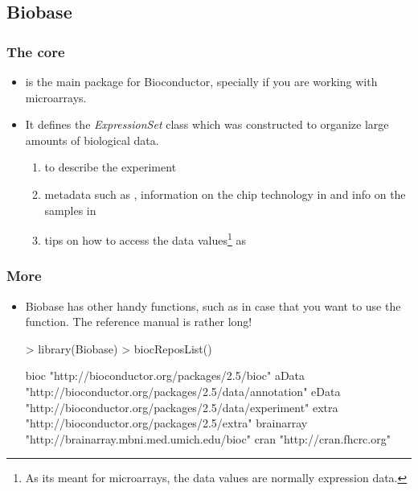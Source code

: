 \subsection{Biobase}

\begin{frame}[allowframebreaks]
  \frametitle{The core}
  \begin{itemize}
  \item {} is the main package for Bioconductor, specially if you are working with microarrays.
  \item It defines the \emph{ExpressionSet} class which was constructed to organize large amounts of biological data.
  \begin{enumerate}
  \item {} to describe the experiment
  \item metadata such as , information on the chip technology in  and info on the samples in 
  \item tips on how to access the data values\footnote{As its meant for microarrays, the data values are normally expression data.} as 
  \end{enumerate}
  \end{itemize}
\end{frame}

\begin{frame}
  \frametitle{More}
  \begin{itemize}
  \item Biobase has other handy functions, such as  in case that you want to use the  function. The reference manual is rather long!
\begin{Schunk}
\begin{Sinput}
> library(Biobase)
> biocReposList()
\end{Sinput}
\begin{Soutput}
                                                  bioc 
           "http://bioconductor.org/packages/2.5/bioc" 
                                                 aData 
"http://bioconductor.org/packages/2.5/data/annotation" 
                                                 eData 
"http://bioconductor.org/packages/2.5/data/experiment" 
                                                 extra 
          "http://bioconductor.org/packages/2.5/extra" 
                                            brainarray 
           "http://brainarray.mbni.med.umich.edu/bioc" 
                                                  cran 
                               "http://cran.fhcrc.org" 
\end{Soutput}
\end{Schunk}
  \end{itemize}
\end{frame}

